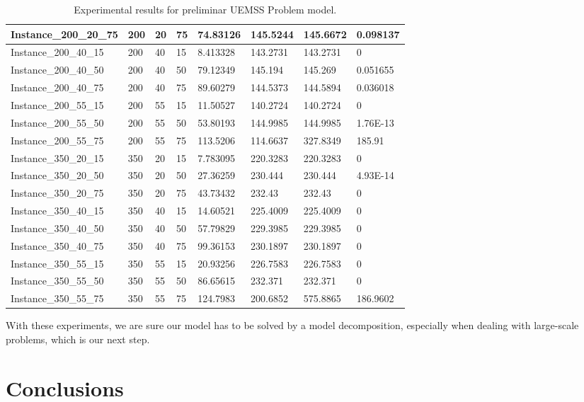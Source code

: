 \begin{table}[]
\begin{tabular}{|l|l|l|l|l|l|l|l|}
Instance\_200\_20\_75 & 200 & 20 & 75 & 74.83126 & 145.5244 & 145.6672 & 0.098137 \\ \hline
Instance\_200\_40\_15 & 200 & 40 & 15 & 8.413328 & 143.2731 & 143.2731 & 0        \\ \hline
Instance\_200\_40\_50 & 200 & 40 & 50 & 79.12349 & 145.194  & 145.269  & 0.051655 \\ \hline
Instance\_200\_40\_75 & 200 & 40 & 75 & 89.60279 & 144.5373 & 144.5894 & 0.036018 \\ \hline
Instance\_200\_55\_15 & 200 & 55 & 15 & 11.50527 & 140.2724 & 140.2724 & 0        \\ \hline
Instance\_200\_55\_50 & 200 & 55 & 50 & 53.80193 & 144.9985 & 144.9985 & 1.76E-13 \\ \hline
Instance\_200\_55\_75 & 200 & 55 & 75 & 113.5206 & 114.6637 & 327.8349 & 185.91   \\ \hline
Instance\_350\_20\_15 & 350 & 20 & 15 & 7.783095 & 220.3283 & 220.3283 & 0        \\ \hline
Instance\_350\_20\_50 & 350 & 20 & 50 & 27.36259 & 230.444  & 230.444  & 4.93E-14 \\ \hline
Instance\_350\_20\_75 & 350 & 20 & 75 & 43.73432 & 232.43   & 232.43   & 0        \\ \hline
Instance\_350\_40\_15 & 350 & 40 & 15 & 14.60521 & 225.4009 & 225.4009 & 0        \\ \hline
Instance\_350\_40\_50 & 350 & 40 & 50 & 57.79829 & 229.3985 & 229.3985 & 0        \\ \hline
Instance\_350\_40\_75 & 350 & 40 & 75 & 99.36153 & 230.1897 & 230.1897 & 0        \\ \hline
Instance\_350\_55\_15 & 350 & 55 & 15 & 20.93256 & 226.7583 & 226.7583 & 0        \\ \hline
Instance\_350\_55\_50 & 350 & 55 & 50 & 86.65615 & 232.371  & 232.371  & 0        \\ \hline
Instance\_350\_55\_75 & 350 & 55 & 75 & 124.7983 & 200.6852 & 575.8865 & 186.9602 \\ \hline
\end{tabular}
\caption{Experimental results for preliminar UEMSS Problem model.}	\label{tab:results}
\end{table}

With these experiments, we are sure our model has to be solved by a model decomposition, especially when dealing with large-scale problems, which is our next step. 

\chapter{Conclusions}\label{cap:concl}

